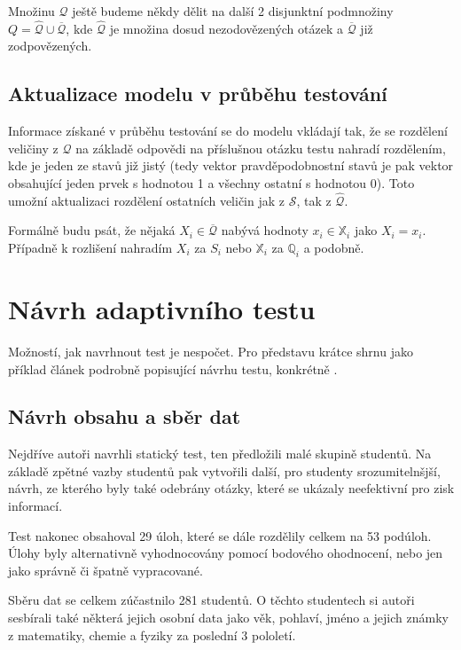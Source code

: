 \documentclass[a4paper,twoside,12pt]{scrbook}
\begin{document}
Množinu $\mathcal{Q}$ ještě budeme někdy dělit na další 2 disjunktní podmnožiny $Q = \widehat{\mathcal{Q}} \cup \overline{\mathcal{Q}}$, kde $\widehat{\mathcal{Q}}$ je množina dosud nezodovězených otázek a $\overline{\mathcal{Q}}$ již zodpovězených.

\subsection{Aktualizace modelu v průběhu testování}
Informace získané v průběhu testování se do modelu vkládají tak, že se rozdělení veličiny z $\mathcal{Q}$ na základě odpovědi na příslušnou otázku testu nahradí rozdělením, kde je jeden ze stavů již jistý (tedy vektor pravděpodobnostní stavů je pak vektor obsahující jeden prvek s hodnotou 1 a všechny ostatní s hodnotou 0). Toto umožní aktualizaci rozdělení ostatních veličin jak z $\mathcal{S}$, tak z $\widehat{\mathcal{Q}}$.

Formálně budu psát, že nějaká $X_i \in \overline{\mathcal{Q}}$ nabývá hodnoty $x_i \in \mathbb{X}_i$ jako $X_i = x_i$. Případně k rozlišení nahradím $X_i$ za $S_i$ nebo $\mathbb{X}_i$ za $\mathbb{Q}_i$ a podobně.


\section{Návrh adaptivního testu}
\label{sec:test_design}
Možností, jak navrhnout test je nespočet. Pro představu krátce shrnu jako příklad článek podrobně popisující návrhu testu, konkrétně \cite{vomlel_plajner2015}.

\subsection{Návrh obsahu a sběr dat}
Nejdříve autoři navrhli statický test, ten předložili malé skupině studentů. Na základě zpětné vazby studentů pak vytvořili další, pro studenty srozumitelnšjší, návrh, ze kterého byly také odebrány otázky, které se ukázaly neefektivní pro zisk informací.

Test nakonec obsahoval 29 úloh, které se dále rozdělily celkem na 53 podúloh. Úlohy byly alternativně vyhodnocovány pomocí bodového ohodnocení, nebo jen jako správně či špatně vypracované.

Sběru dat se celkem zúčastnilo 281 studentů. O těchto studentech si autoři sesbírali také některá jejich osobní data jako věk, pohlaví, jméno a jejich známky z matematiky, chemie a fyziky za poslední 3 pololetí.
\end{document}
